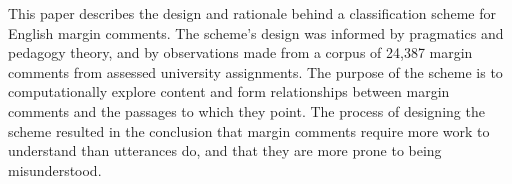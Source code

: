 This paper describes the design and rationale behind a classification scheme for English margin comments. The scheme's design was informed by pragmatics and pedagogy theory, and by observations made from a corpus of 24,387 margin comments from assessed university assignments. The purpose of the scheme is to computationally explore content and form relationships between margin comments and the passages to which they point. The process of designing the scheme resulted in the conclusion that margin comments require more work to understand than utterances do, and that they are more prone to being misunderstood.

